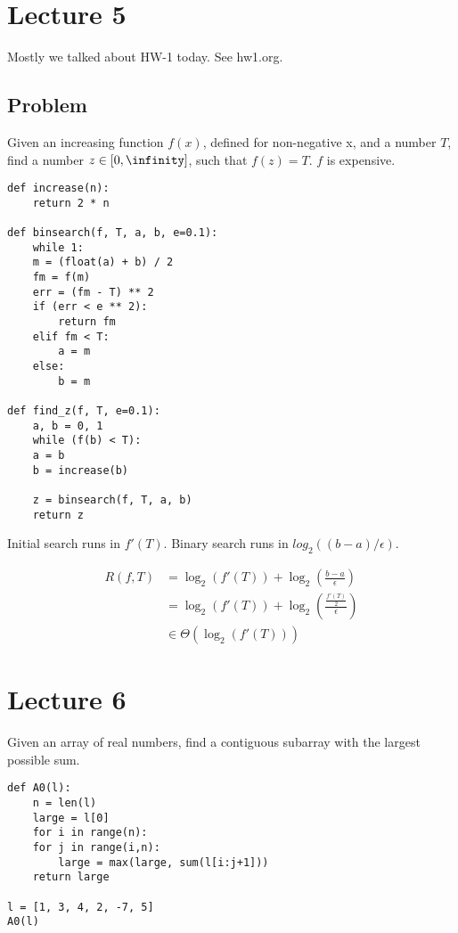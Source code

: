 \documentclass[12pt]{article}
\begin{document}
\section{Lecture 5}
\label{sec-6}

Mostly we talked about HW-1 today. See hw1.org.

\subsection{Problem}
\label{sec-6-1}

Given an increasing function $f(x)$, defined for non-negative x, and a
number $T$, find a number $z \in [0,\infinity]$, such that $f(z) =
T$. $f$ is expensive.

\lstset{language=Python,label= ,caption= ,numbers=none}
\begin{lstlisting}
def increase(n):
    return 2 * n

def binsearch(f, T, a, b, e=0.1):
    while 1:
	m = (float(a) + b) / 2
	fm = f(m)
	err = (fm - T) ** 2
	if (err < e ** 2):
	    return fm
	elif fm < T:
	    a = m
	else:
	    b = m

def find_z(f, T, e=0.1):
    a, b = 0, 1
    while (f(b) < T):
	a = b
	b = increase(b)

    z = binsearch(f, T, a, b)
    return z
\end{lstlisting}

Initial search runs in $f'(T)$. Binary search runs in
$log_2((b-a)/\epsilon)$.

\begin{align}
  R(f, T) &= \log_2(f'(T)) + \log_2(\frac{b-a}{\epsilon}) \\
  &= \log_2(f'(T)) + \log_2(\frac{\frac{f'(T)}{2}}{\epsilon}) \\
  &\in \Theta(\log_2(f'(T)))
\end{align}

\section{Lecture 6}
\label{sec-7}

Given an array of real numbers, find a contiguous subarray with the
largest possible sum.

\lstset{language=Python,label= ,caption= ,numbers=none}
\begin{lstlisting}
def A0(l):
    n = len(l)
    large = l[0]
    for i in range(n):
	for j in range(i,n):
	    large = max(large, sum(l[i:j+1]))
    return large

l = [1, 3, 4, 2, -7, 5]
A0(l)
\end{lstlisting}
\end{document}
